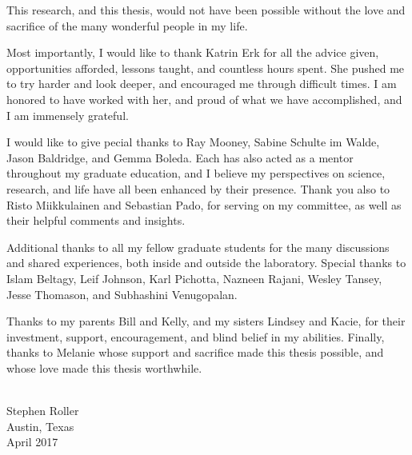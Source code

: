 This research, and this thesis, would not have been possible without the
love and sacrifice of the many wonderful people in my life.

Most importantly, I would like to thank Katrin Erk for all the advice given,
opportunities afforded, lessons taught, and countless hours spent. She pushed
me to try harder and look deeper, and encouraged me through difficult times.
I am honored to have worked with her, and proud of what we have accomplished,
and I am immensely grateful.

I would like to give pecial thanks to Ray Mooney, Sabine Schulte im Walde,
Jason Baldridge, and Gemma Boleda. Each has also acted as a mentor throughout
my graduate education, and I believe my perspectives on science, research, and
life have all been enhanced by their presence. Thank you also to
Risto Miikkulainen and Sebastian Pado, for serving on my committee, as well
as their helpful comments and insights.

Additional thanks to all my fellow graduate students for the many discussions
and shared experiences, both inside and outside the laboratory. Special thanks
to Islam Beltagy, Leif Johnson, Karl Pichotta, Nazneen Rajani,
Wesley Tansey, Jesse Thomason, and Subhashini Venugopalan.

Thanks to my parents Bill and Kelly, and my sisters Lindsey and Kacie, for
their investment, support, encouragement, and blind belief in my abilities.
Finally, thanks to Melanie whose support and sacrifice made this
thesis possible, and whose love made this thesis worthwhile.

\begin{flushright}
~\\
Stephen Roller\\
Austin, Texas\\
April 2017
\end{flushright}

